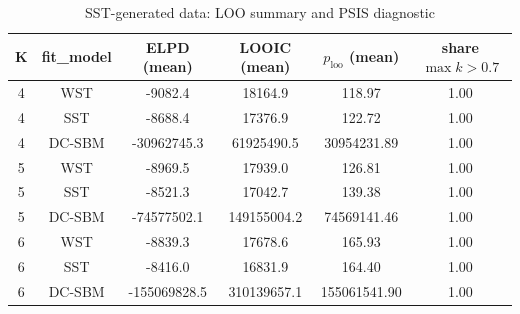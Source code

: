 \begin{table}[!h]
\centering
\caption{SST-generated data: LOO summary and PSIS diagnostic\\\label{tab:sst-loo}}
\centering
\begin{tabular}[t]{cccccc}
\toprule
K & fit_model & ELPD (mean) & LOOIC (mean) & $p_{\text{loo}}$ (mean) & share $\max k > 0.7$\\
\midrule
4 & WST & -9082.4 & 18164.9 & 118.97 & 1.00\\
4 & SST & -8688.4 & 17376.9 & 122.72 & 1.00\\
4 & DC-SBM & -30962745.3 & 61925490.5 & 30954231.89 & 1.00\\
5 & WST & -8969.5 & 17939.0 & 126.81 & 1.00\\
5 & SST & -8521.3 & 17042.7 & 139.38 & 1.00\\
5 & DC-SBM & -74577502.1 & 149155004.2 & 74569141.46 & 1.00\\
6 & WST & -8839.3 & 17678.6 & 165.93 & 1.00\\
6 & SST & -8416.0 & 16831.9 & 164.40 & 1.00\\
6 & DC-SBM & -155069828.5 & 310139657.1 & 155061541.90 & 1.00\\
\bottomrule
\end{tabular}
\end{table}
